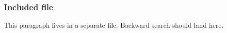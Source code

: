 \subsubsection{Included file}
This paragraph lives in a separate file. Backward search should land here.
